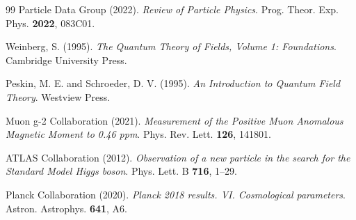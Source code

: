\begin{thebibliography}{99}
		Particle Data Group (2022). \textit{Review of Particle Physics}. Prog. Theor. Exp. Phys. \textbf{2022}, 083C01.
		
		Weinberg, S. (1995). \textit{The Quantum Theory of Fields, Volume 1: Foundations}. Cambridge University Press.
		
		Peskin, M. E. and Schroeder, D. V. (1995). \textit{An Introduction to Quantum Field Theory}. Westview Press.
		
		Muon g-2 Collaboration (2021). \textit{Measurement of the Positive Muon Anomalous Magnetic Moment to 0.46 ppm}. Phys. Rev. Lett. \textbf{126}, 141801.
		
		ATLAS Collaboration (2012). \textit{Observation of a new particle in the search for the Standard Model Higgs boson}. Phys. Lett. B \textbf{716}, 1--29.
		
		Planck Collaboration (2020). \textit{Planck 2018 results. VI. Cosmological parameters}. Astron. Astrophys. \textbf{641}, A6.
	\end{thebibliography}
